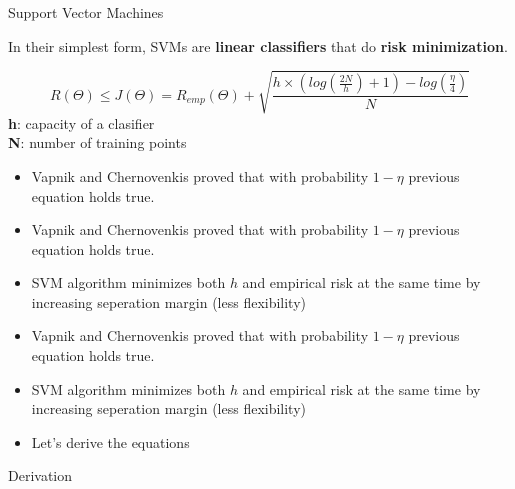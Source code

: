\documentclass[12pt,fleqn]{article}
\begin{document}
Support Vector Machines

In their simplest form, SVMs are \textbf{linear classifiers} that do
\textbf{risk minimization}.

\begin{equation}
R(\Theta) \leq J(\Theta) = R_{emp}(\Theta) +
\sqrt{ \frac{h \times (log(\frac{2N}{h}) + 1) - log(\frac{\eta}{4})}{N}} \nonumber
\end{equation}
\textbf{h}: capacity of a clasifier \\
\textbf{N}: number of training points 

\begin{itemize}
   \item Vapnik and Chernovenkis proved that with probability $1-\eta$ previous
equation holds true.
\end{itemize}

\begin{itemize}
   \item Vapnik and Chernovenkis proved that with probability $1-\eta$ previous
equation holds true.
   \item SVM algorithm minimizes both $h$ and empirical risk at the same time by
   increasing seperation margin (less flexibility)
\end{itemize}

\begin{itemize}
   \item Vapnik and Chernovenkis proved that with probability $1-\eta$ previous
equation holds true.
   \item SVM algorithm minimizes both $h$ and empirical risk at the same time by
   increasing seperation margin (less flexibility)
   \item Let's derive the equations
\end{itemize}

Derivation

\begin{figure}[!hbp]
\caption{}
\end{figure}
\end{document}

